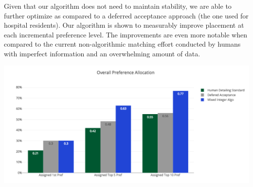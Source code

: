 Given that our algorithm does not need to maintain stability, we are able to further optimize as compared to a deferred acceptance approach (the one used for hospital residents).  Our algorithm is shown to measurably improve placement at each incremental preference level. The improvements are even more notable when compared to the current non-algorithmic matching effort conducted by humans with imperfect information and an overwhelming amount of data.  


\begin{center}
\includegraphics[scale=0.75]{Sections/figures/med_bar.png}
\end{center}


